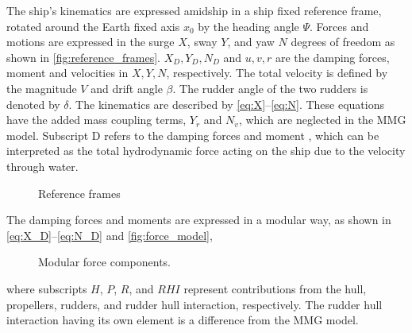 The ship's kinematics are expressed amidship in a ship fixed reference frame, rotated around the Earth fixed axis $x_0$ by the heading angle \(\Psi\). Forces and motions are expressed in the surge $X$, sway $Y$, and yaw $N$ degrees of freedom as shown in \autoref{fig:reference_frames}. 
$X_D,Y_D,N_D$ and $u,v,r$ are the damping forces, moment and velocities in $X,Y,N$, respectively.
The total velocity is defined by the magnitude \(V\) and drift angle \(\beta\). The rudder angle of the two rudders is denoted by \(\delta\).
The kinematics are described by \autoref{eq:X}--\autoref{eq:N}. 
These equations have the added mass coupling terms, $Y_{\dot{r}}$ and $N_{\dot{v}}$, which are neglected in the MMG model. Subscript D refers to the damping forces and moment \citep{fossen_handbook_2021}, which can be interpreted as the total hydrodynamic force acting on the ship due to the velocity through water.
%
\begin{figure}[h]
    \centering
    
    \caption{Reference frames}
    \label{fig:reference_frames}
\end{figure}
%
\begin{equation}
    \label{eq:X}
    
\end{equation}
%
\begin{equation}
    \label{eq:Y}
    
\end{equation}
%
\begin{equation}
    \label{eq:N}
    
\end{equation}
The damping forces and moments are expressed in a modular way, as shown in \autoref{eq:X_D}--\autoref{eq:N_D} and \autoref{fig:force_model},
\begin{equation}
    \label{eq:X_D}
    
\end{equation}
%
\begin{equation}
    \label{eq:Y_D}
    
\end{equation}
%
\begin{equation}
    \label{eq:N_D}
    
\end{equation}
%
\begin{figure}[h]
    \centering
    
    \caption{Modular force components.}
    \label{fig:force_model}
\end{figure}
where subscripts $H$, $P$, $R$, and $RHI$ represent contributions from the hull, propellers, rudders, and rudder hull interaction, respectively. The rudder hull interaction having its own element is a difference from the MMG model.

